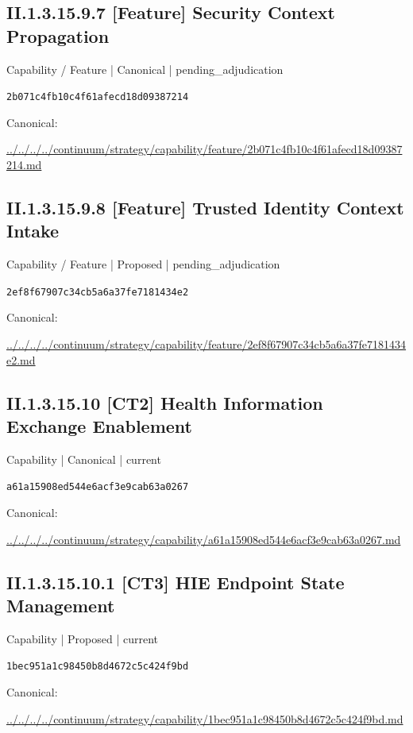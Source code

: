 \documentclass[10pt,a4paper]{article}
\begin{document}
\subsection*{II.1.3.15.9.7 [Feature] Security Context Propagation}
{\small Capability / Feature | Canonical | pending\_adjudication}\par
\texttt{2b071c4fb10c4f61afecd18d09387214}\par
Canonical: \par
{\footnotesize\url{../../../../continuum/strategy/capability/feature/2b071c4fb10c4f61afecd18d09387214.md}}\par
\subsection*{II.1.3.15.9.8 [Feature] Trusted Identity Context Intake}
{\small Capability / Feature | Proposed | pending\_adjudication}\par
\texttt{2ef8f67907c34cb5a6a37fe7181434e2}\par
Canonical: \par
{\footnotesize\url{../../../../continuum/strategy/capability/feature/2ef8f67907c34cb5a6a37fe7181434e2.md}}\par
\subsection*{II.1.3.15.10 [CT2] Health Information Exchange Enablement}
{\small Capability | Canonical | current}\par
\texttt{a61a15908ed544e6acf3e9cab63a0267}\par
Canonical: \par
{\footnotesize\url{../../../../continuum/strategy/capability/a61a15908ed544e6acf3e9cab63a0267.md}}\par
\subsection*{II.1.3.15.10.1 [CT3] HIE Endpoint State Management}
{\small Capability | Proposed | current}\par
\texttt{1bec951a1c98450b8d4672c5c424f9bd}\par
Canonical: \par
{\footnotesize\url{../../../../continuum/strategy/capability/1bec951a1c98450b8d4672c5c424f9bd.md}}\par
\end{document}
